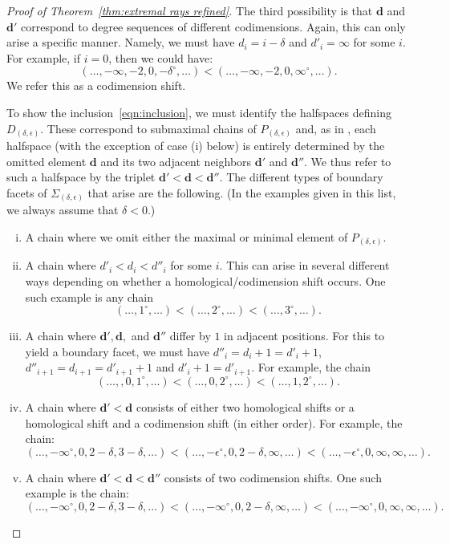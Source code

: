 \documentclass[12pt]{amsart}
\theoremstyle{definition}
\theoremstyle{remark}
\newcommand{\dd}{\mathbf{d}}
\newcommand{\defi}[1]{\textsf{#1}} %
\newcommand{\zp}{\circ}
\begin{document}
\begin{proof}[Proof of Theorem~\ref{thm:extremal rays refined}]
The third possibility is that $\dd$ and $\dd'$ correspond to degree sequences of different codimensions.  Again, this can only arise a specific manner.  Namely, we must have $d_{i}=i-\delta$ and $d'_i=\infty$ for some $i$.  
For example, if $i=0$, then we could have:
\[
(\dots, -\infty, -2, 0, -\delta^\circ, \dots)<(\dots, -\infty,-2, 0, \infty^\circ, \dots).
\]
We refer this as a \defi{codimension shift}.  


To show the inclusion~\eqref{eqn:inclusion}, we must identify the halfspaces defining $D_{(\delta,\epsilon)}$.  These correspond to submaximal chains of $P_{(\delta,\epsilon)}$ and, as in \cite[Proposition~2.12]{boij-sod1}, each halfspace (with the exception of case (i) below) is entirely determined by the omitted element $\dd$ and its two adjacent neighbors $\dd'$ and $\dd''$.  We thus refer to such a halfspace by the triplet $\dd'<\dd<\dd''$.  The different types of boundary facets of $\Sigma_{(\delta,\epsilon)}$ that arise are the following.  (In the examples given in this list, we always assume that $\delta<0$.)

\begin{enumerate}[(i)]

	\item A chain where we omit either the maximal or minimal element of $P_{(\delta,\epsilon)}$.

	\item A chain where $d'_i<d_i<d''_i$ for some $i$.  This can arise in several different ways depending on whether a homological/codimension shift occurs.
	One such example is any chain
	\[
(\dots,1^\zp,\dots) <(\dots, 2^\zp,\dots) <(\dots,3^\zp,\dots).
	\]

	\item A chain where $\dd', \dd,$ and $\dd''$ differ by $1$ in adjacent positions.  For this to yield a boundary facet, we must have $d''_i=d_i+1=d'_i+1$, $d''_{i+1}=d_{i+1}=d'_{i+1}+1$ and $d'_i+1=d'_{i+1}$.  For example, the chain
			\[
(\dots,, 0,1^\zp,\dots) <(\dots, 0,2^\zp,\dots) <(\dots, 1,2^\zp,\dots) .
			\]
	\item A chain where $\dd'<\dd$ consists of either two homological shifts or a homological shift and a codimension shift (in either order).  
For example, the chain:
		\[
		(\dots, -\infty^\zp,0,2-\delta,3-\delta,\dots)<(\dots, -\epsilon^\zp,0,2-\delta,\infty,\dots)<(\dots, -\epsilon^\zp,0,\infty,\infty,\dots).
		\]

	\item A chain where $\dd'<\dd<\dd''$ consists of two codimension shifts.
One such example is the chain:
\[
(\dots, -\infty^\zp,0,2-\delta,3-\delta,\dots)<(\dots, -\infty^\zp,0,2-\delta,\infty,\dots)<(\dots, -\infty^\zp,0,\infty,\infty,\dots).
\]


\end{enumerate}
\end{proof}
\end{document}
